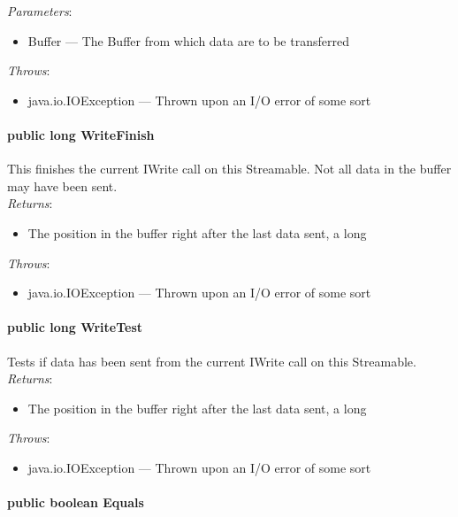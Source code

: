 \documentclass[$Date: 2003/06/26 19:29:31 $]{glabarticle}
\begin{document}
\textit{Parameters}:
\begin{itemize}
\item[] Buffer --- The Buffer from which data are to be transferred 
\end{itemize}

 \textit{Throws}:
 \begin{itemize}
 \item[] java.io.IOException --- Thrown upon an I/O error of some sort 
 \end{itemize}

\paragraph{public long WriteFinish}

This finishes the current IWrite call on this Streamable.  Not all data in
the buffer may have been sent.\\

\textit{Returns}:
\begin{itemize}
\item[] The position in the buffer right after the last data sent, a long
\end{itemize}

 \textit{Throws}:
 \begin{itemize}
 \item[] java.io.IOException --- Thrown upon an I/O error of some sort 
 \end{itemize}

\paragraph{public long WriteTest}

Tests if data has been sent from  the current IWrite call on this Streamable.\\

\textit{Returns}:
\begin{itemize}
\item[] The position in the buffer right after the last data sent, a long
\end{itemize}

 \textit{Throws}:
 \begin{itemize}
 \item[] java.io.IOException --- Thrown upon an I/O error of some sort 
 \end{itemize}
 
\paragraph{public boolean Equals}
\end{document}
